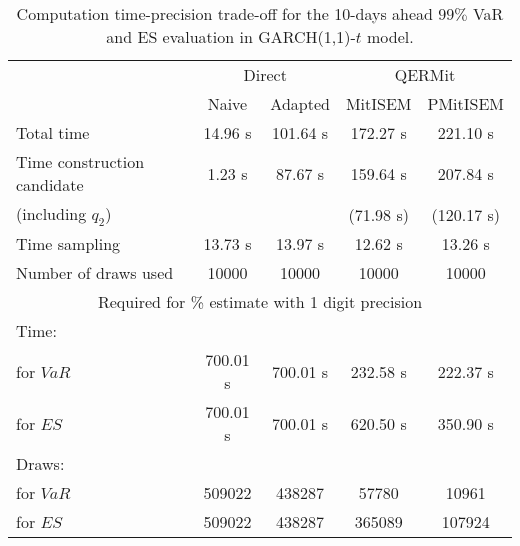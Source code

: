 { \renewcommand{\arraystretch}{1.3} 
\begin{table}[h] 
\centering 
\caption{Computation time-precision trade-off for the 10-days ahead  $99\%$ VaR and ES evaluation in GARCH(1,1)-$t$ model.} 
\label{tab:time_precision_t_garch2_noS} 
\begin{tabular}{lcccc}  
  & \multicolumn{2}{c}{Direct} & \multicolumn{2}{c}{QERMit}  \\ \cline{2-5} 
  & Naive & Adapted & MitISEM & PMitISEM  \\ \hline 
Total time & 14.96 s & 101.64 s & 172.27 s & 221.10 s \\ 
Time construction candidate & 1.23 s & 87.67 s & 159.64 s & 207.84 s \\ 
 (including $q_{2}$) &   &  & (71.98 s) & (120.17 s) \\ 
Time sampling & 13.73 s & 13.97 s & 12.62 s & 13.26 s  \\  
Number of draws used & 10000 & 10000 & 10000 & 10000 \\ \hline 
\multicolumn{5}{c}{Required for \% estimate with 1 digit precision} \\ \hline 
Time: &  &  &   &  \\ 
\hspace{1cm} for $VaR$ & 700.01 s & 700.01 s & 232.58 s & 222.37 s \\ 
\hspace{1cm} for $ES$ & 700.01 s & 700.01 s & 620.50 s & 350.90 s \\ 
Draws: &  &  &   &  \\ 
\hspace{1cm} for $VaR$ & 509022 & 438287  &  57780  &  10961  \\ 
\hspace{1cm} for $ES$ & 509022 & 438287  & 365089   & 107924  \\ 
\hline 
\end{tabular} 
\end{table} 
} 

